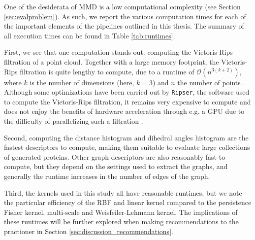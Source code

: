 One of the desiderata of MMD is a low computational complexity (see Section
\ref{sec:evalproblem}). As such, we report the various computation times for
each of the important elements of the pipelines outlined in this thesis. The
summary of all execution times can be found in Table \ref{tab:runtimes}.

First, we see that one computation stands out: computing the Vietoris-Rips
filtration of a point cloud. Together with a large memory footprint, the
Vietoris-Rips filtration is quite lengthy to compute, due to a runtime of
$\mathcal{O}(n^{3(k+2)})$, where $k$ is the number of dimensions (here, $k=3$)
and $n$ the number of points \citep{adams2018persistent}. Although some optimizations have been carried out
by \texttt{Ripser}, the software used to compute the Vietoris-Rips filtration,
it remains very expensive to compute and does not enjoy the benefits of hardware
acceleration through e.g. a GPU due to the difficulty of parallelizing such a
filtration \cite{Bauer2021Ripser}.

Second, computing the distance histogram and dihedral angles histogram are the
fastest descriptors to compute, making them suitable to evaluate large
collections of generated proteins. Other graph descriptors are also reasonably
fast to compute, but they depend on the settings used to extract the graphs, and
generally the runtime increases in the number of edges of the graph.

Third, the kernels used in this study all have reasonable runtimes, but we note
the particular efficiency of the RBF and linear kernel compared to the
persistence Fisher kernel, multi-scale and Weisfeiler-Lehmann kernel. The
implications of these runtimes will be further explored when making
recommendations to the practioner in Section
\ref{sec:discussion_recommendations}.


